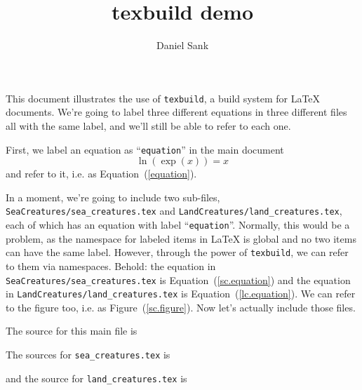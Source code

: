 \documentclass{article}
\author{Daniel Sank}
\title{texbuild demo}
\begin{document}
\maketitle

This document illustrates the use of \texttt{texbuild}, a build system for \LaTeX{} documents.
We're going to label three different equations in three different files all with the same label, and we'll still be able to refer to each one.

First, we label an equation as ``\texttt{equation}'' in the main document
\begin{equation}
  \ln(\exp(x)) = x \label{equation} %
\end{equation}
and refer to it, i.e. as Equation~(\ref{equation}).

In a moment, we're going to include two sub-files, \texttt{SeaCreatures/sea\_creatures.tex} and \texttt{LandCreatures/land\_creatures.tex}, each of which has an equation with label ``\texttt{equation}''.
Normally, this would be a problem, as the namespace for labeled items in \LaTeX{} is global and no two items can have the same label.
However, through the power of \texttt{texbuild}, we can refer to them via namespaces.
Behold: the equation in \texttt{SeaCreatures/sea\_creatures.tex} is Equation~(\ref{sc.equation}) and the equation in \texttt{LandCreatures/land\_creatures.tex} is Equation~(\ref{lc.equation}).
We can refer to the figure too, i.e. as Figure~(\ref{sc.figure}).
Now let's actually include those files.




The source for this main file is

The sources for \texttt{sea\_creatures.tex} is

and the source for \texttt{land\_creatures.tex} is

\end{document}
